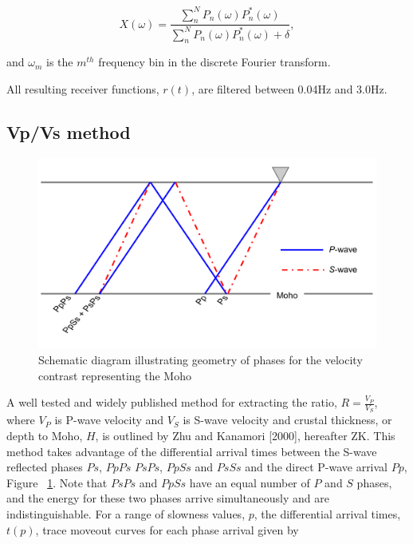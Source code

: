 \documentclass[draft, 12pt]{article}
\begin{document}
\begin{equation}
  X(\omega) = \frac {\sum_n^N P_n(\omega)P_n^*(\omega)} {\sum_n^N P_n(\omega)P_n^*(\omega) + \delta},
\end{equation}

and $\omega_m$ is the $m^{th}$ frequency bin in the discrete Fourier transform.

  All resulting receiver functions, $r(t)$, are filtered between 0.04Hz and 3.0Hz.



\subsection{Vp/Vs method}

\begin{figure}
  \centering
    \includegraphics[width=\textwidth]{reflectedPhases}
  \caption{Schematic diagram illustrating geometry of phases for the velocity contrast representing the Moho}
  \label{fig:reflectedPhases}
\end{figure}


  A well tested and widely published method for extracting the ratio, $R=\frac{V_P}{V_S}$, where $V_P$ is P-wave velocity and $V_S$ is S-wave velocity and crustal thickness, or depth to Moho, $H$, is outlined by Zhu and Kanamori [2000], hereafter ZK. This method takes advantage of the differential arrival times between the S-wave reflected phases $Ps$, $PpPs$ $PsPs$, $PpSs$ and $PsSs$ and the direct P-wave arrival $Pp$, Figure ~\ref{fig:reflectedPhases}. Note that $PsPs$ and $PpSs$ have an equal number of $P$ and $S$ phases, and the energy for these two phases arrive simultaneously and are indistinguishable. For a range of slowness values, $p$, the differential arrival times, $t(p)$, trace moveout curves for each phase arrival given by
\end{document}

